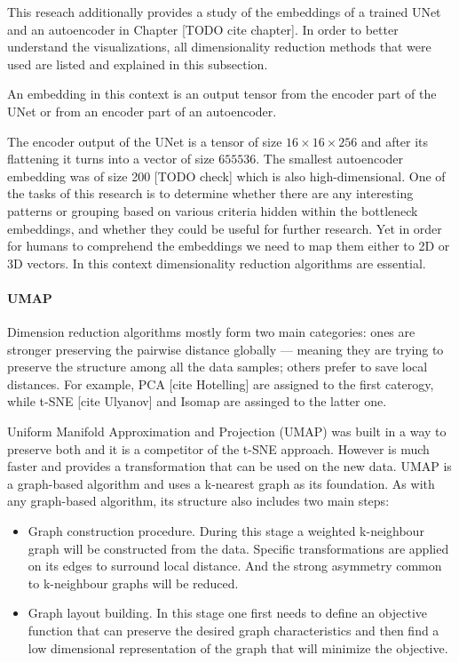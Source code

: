 This reseach additionally provides a study of the embeddings of a trained UNet and an autoencoder in Chapter [TODO cite chapter]. In order to better understand the visualizations, all dimensionality reduction methods that were used are listed and explained in this subsection.

\begin{definition}[Embedding]
    An embedding in this context is an output tensor from the encoder part of the UNet or from an encoder part of an autoencoder.
\end{definition}

The encoder output of the UNet is a tensor of size $16 \times 16 \times 256$ and after its flattening it turns into a vector of size $655536$. The smallest autoencoder embedding was of size 200 [TODO check] which is also high-dimensional. One of the tasks of this research is to determine whether there are any interesting patterns or grouping based on various criteria hidden within the bottleneck embeddings, and whether they could be useful for further research. Yet in order for humans to comprehend the embeddings we need to map them either to 2D or 3D vectors. In this context dimensionality reduction algorithms are essential.

\paragraph{UMAP}
Dimension reduction algorithms mostly form two main categories: ones are stronger preserving the pairwise
distance globally --- meaning they are trying to preserve the structure among all the data samples; others prefer to save local distances. For example, PCA [cite Hotelling] are assigned to the first caterogy, while t-SNE [cite Ulyanov] and Isomap are assinged to the latter one.

Uniform Manifold Approximation and Projection (UMAP) was built in a way to preserve both and it is a competitor of the t-SNE approach. However is much faster and provides a transformation that can be used on the new data. UMAP is a graph-based algorithm and uses a k-nearest graph as its foundation. As with any graph-based algorithm, its structure also includes two main steps: 

\begin{itemize}
    \item Graph construction procedure. During this stage a weighted k-neighbour graph will be constructed from the data. Specific transformations are applied on its edges to surround local distance. And the strong asymmetry common to k-neighbour graphs will be reduced.
    \item Graph layout building. In this stage one first needs to define an objective function that can preserve the desired graph characteristics and then find a low dimensional representation of the graph that will minimize the objective.
\end{itemize}

